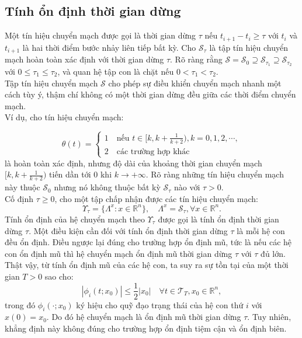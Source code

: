 \documentclass[14pt,a4paper,oneside]{report}		%
\theoremstyle{definition}
\begin{document}
\subsection{Tính ổn định thời gian dừng}
Một tín hiệu chuyển mạch được gọi là thời gian dừng $\tau$ nếu $t_{i+1}-t_i\geq\tau$ với $t_i$ và $t_{i+1}$ là hai thời điểm bước nhảy liên tiếp bất kỳ. Cho $\mathcal{S}_\tau$ là tập tín hiệu chuyển mạch hoàn toàn xác định với thời gian dừng $\tau$. Rõ ràng rằng $\mathcal{S}=\mathcal{S}_0\supseteq\mathcal{S}_{\tau_1}\supseteq\mathcal{S}_{\tau_2}$ với $0\leq\tau_1\leq\tau_2$, và quan hệ tập con là chặt nếu $0<\tau_1<\tau_2$.\\

Tập tín hiệu chuyển mạch $\mathcal{S}$ cho phép sự điều khiển chuyển mạch nhanh một cách tùy ý, thậm chí không có một thời gian dừng đều giữa các thời điểm chuyển mạch.\\

Ví dụ, cho tín hiệu chuyển mạch:

$$\theta(t)=\begin{cases}
1\quad\text{nếu } t\in[k,k+\frac{1}{k+2}), k=0,1,2,\cdots,\\
2\quad\text{các trường hợp khác}
\end{cases}$$
là hoàn toàn xác định, nhưng độ dài của khoảng thời gian chuyển mạch $[k,k+\frac{1}{k+2})$ tiến dần tới $0$ khi $k\rightarrow +\infty$. Rõ ràng những tín hiệu chuyển mạch này thuộc $\mathcal{S}_0$ nhưng nó không thuộc bất kỳ $\mathcal{S}_\tau$ nào với $\tau>0$.\\

Cố định $\tau \geq 0$, cho một tập chấp nhận được các tín hiệu chuyển mạch:
$$\Upsilon_\tau=\{\Lambda^x:x\in\mathbb{R}^n\},\quad \Lambda^x=\mathcal{S}_\tau,\forall x\in\mathbb{R}^n.$$
Tính ổn định của hệ chuyển mạch theo $\Upsilon_\tau$ được gọi là tính ổn định thời gian dừng $\tau$. Một điều kiện cần đối với tính ổn định thời gian dừng $\tau$ là mỗi hệ con đều ổn định. Điều ngược lại đúng cho trường hợp ổn định mũ, tức là nếu các hệ con ổn định mũ thì hệ chuyển mạch ổn định mũ thời gian dừng $\tau$ với $\tau$ đủ lớn. Thật vậy, từ tính ổn định mũ của các hệ con, ta suy ra sự tồn tại của một thời gian $T>0$ sao cho:
$$|\phi_i(t;x_0)|\leq\frac{1}{2}|x_0|\quad\forall t\in\mathcal{T}_T,x_0\in\mathbb{R}^n,$$
trong đó $\phi_i(\cdot;x_0)$ ký hiệu cho quỹ đạo trạng thái của hệ con thứ $i$ với $x(0) = x_0$. Do đó hệ chuyển mạch là ổn định mũ thời gian dừng $\tau$. Tuy nhiên, khẳng định này không đúng cho trường hợp ổn định tiệm cận và ổn định biên.
\end{document}
